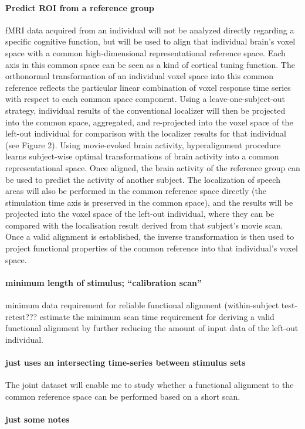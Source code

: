 \paragraph{Predict ROI from a reference group}
%
fMRI data acquired from an individual will not be analyzed directly regarding a
specific cognitive function, but will be used to align that individual brain's
voxel space with a common high-dimensional representational reference space.
%
Each axis in this common space can be seen as a kind of cortical tuning
function.
%
The orthonormal transformation of an individual voxel space into this common
reference reflects the particular linear combination of voxel response time
series with respect to each common space component.
%
Using a leave-one-subject-out strategy, individual results of the conventional
localizer will then be projected into the common space, aggregated, and
re-projected into the voxel space of the left-out individual for comparison with
the localizer results for that individual (see Figure 2).
%
Using movie-evoked brain activity, hyperalignment procedure learns subject-wise
optimal transformations of brain activity into a common representational space.
%
Once aligned, the brain activity of the reference group can be used to predict
the activity of another subject.
%
The localization of speech areas will also be performed in the common reference
space directly (the stimulation time axis is preserved in the common space), and
the results will be projected into the voxel space of the left-out individual,
where they can be compared with the localisation result derived from that
subject’s movie scan.
%
Once a valid alignment is established, the inverse transformation is then used
to project functional properties of the common reference into that individual's
voxel space.


\paragraph{minimum length of stimulus; ``calibration scan''}
%
minimum data requirement for reliable functional alignment (within-subject
test-retest???
%
estimate the minimum scan time requirement for deriving a valid functional
alignment by further reducing the amount of input data of the left-out
individual.
\paragraph{just uses an intersecting time-series between stimulus sets}
%
The joint dataset will enable me to study whether a functional alignment to the
common reference space can be performed based on a short scan.


\paragraph{just some notes}

